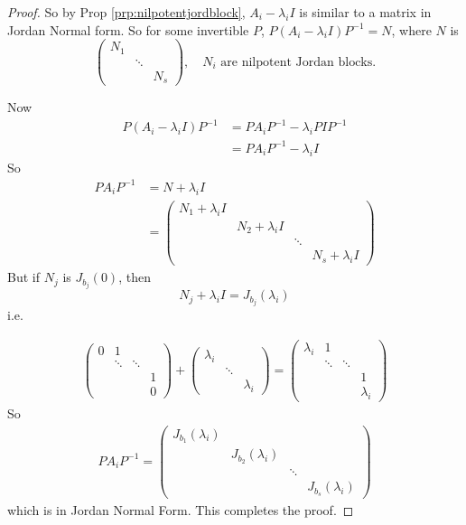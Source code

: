 \documentclass{article}
\theoremstyle{definition} \newtheorem*{definition}{Definition}
\begin{document}
\begin{proof}
  So by Prop \ref{prp:nilpotentjordblock}, $A_i-\lambda_i I$ is similar
  to a matrix in Jordan Normal form. So for some invertible $P$,
  $P(A_i-\lambda_i I)P^{-1} = N$,  where $N$ is 
  \[
    \left( 
    \begin{matrix}
      N_1 &&\\
      &\ddots&\\
      &&N_s
    \end{matrix}
    \right),\quad N_i \text{ are nilpotent Jordan blocks.}
  \]

  Now 
  \begin{align*}
    P(A_i-\lambda_i I)P^{-1} &= PA_iP^{-1} - \lambda_i PI P^{-1}\\
    &= PA_iP^{-1} - \lambda_i I
  \end{align*}
  So
  \begin{align*}
    PA_iP^{-1} &= N+\lambda_i I\\
    &= \left( 
    \begin{matrix}
      N_1 + \lambda_i I &&&\\
      &N_2 +\lambda_i I &&\\
      &&\ddots &\\
      &&&N_s + \lambda_i I
    \end{matrix}
    \right)
  \end{align*}
  But if $N_j$ is $J_{b_j}(0)$, then
  \[
    N_j + \lambda_i I = J_{b_j}(\lambda_i)
  \]
  i.e. 

  \begin{align*}
    \left( 
\begin{matrix}
  0 & 1 & &\\
  &\ddots&\ddots &\\
  &&&1\\
  &&&0
\end{matrix}
    \right)+\left( 
    \begin{matrix}
      \lambda_i &&\\
      &\ddots&\\
      &&\lambda_i
    \end{matrix}
    \right) = \left( 
    \begin{matrix}
      \lambda_i & 1 &&\\
      &\ddots&\ddots&\\
      &&&1\\
      &&&\lambda_i
    \end{matrix}
    \right)
  \end{align*}
  So
  \begin{align*}
    PA_iP^{-1}  = \left( 
    \begin{matrix}
      J_{b_1}(\lambda_i) &&&\\
      &J_{b_2}(\lambda_i)&&\\
      &&\ddots&\\
      &&&J_{b_s}(\lambda_i)
    \end{matrix}
    \right)
  \end{align*}
  which is in Jordan Normal Form. This completes the proof.
\end{proof}
\end{document}
